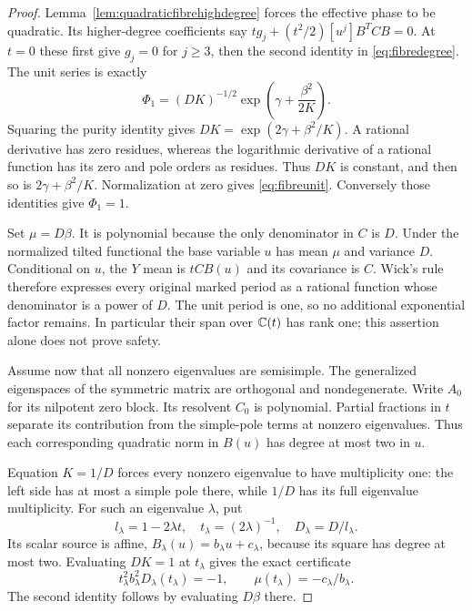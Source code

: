 \begin{proof}
Lemma~\ref{lem:quadraticfibrehighdegree} forces the effective
phase to be quadratic. Its higher-degree coefficients say
$tg_j+(t^2/2)[u^j]B^TCB=0$. At $t=0$ these first give $g_j=0$
for $j\ge3$, then the second identity in
\eqref{eq:fibredegree}. The unit series is exactly
\[
 \Phi_1=(DK)^{-1/2}\exp\!\left(\gamma+\frac{\beta^2}{2K}\right).
\]
Squaring the purity identity gives
$DK=\exp(2\gamma+\beta^2/K)$. A rational derivative has zero
residues, whereas the logarithmic derivative of a rational
function has its zero and pole orders as residues. Thus $DK$
is constant, and then so is $2\gamma+\beta^2/K$.
Normalization at zero gives
\eqref{eq:fibreunit}. Conversely those identities give
$\Phi_1=1$.

Set $\mu=D\beta$. It is polynomial because the only denominator
in $C$ is $D$. Under the normalized tilted functional the base
variable $u$ has mean $\mu$ and variance $D$. Conditional on
$u$, the $Y$ mean is $tCB(u)$ and its covariance is $C$.
Wick's rule therefore expresses every original marked period
as a rational function whose denominator is a power of $D$.
The unit period is one, so no additional exponential factor
remains. In particular their span over $\mathbb C(t)$ has rank one;
this assertion alone does not prove safety.

Assume now that all nonzero eigenvalues are semisimple. The
generalized eigenspaces of the symmetric matrix are orthogonal
and nondegenerate. Write $A_0$ for its nilpotent zero block.
Its resolvent $C_0$ is polynomial. Partial fractions in $t$
separate its contribution from the simple-pole terms at
nonzero eigenvalues. Thus each corresponding quadratic norm
in $B(u)$ has degree at most two in $u$.

Equation $K=1/D$ forces every nonzero eigenvalue to have
multiplicity one: the left side has at most a simple pole
there, while $1/D$ has its full eigenvalue multiplicity.
For such an eigenvalue $\lambda$, put
\[
 l_\lambda=1-2\lambda t,\quad t_\lambda=(2\lambda)^{-1},
 \quad D_\lambda=D/l_\lambda.
\]
Its scalar source is affine, $B_\lambda(u)=b_\lambda u+c_\lambda$,
because its square has degree at most two. Evaluating $DK=1$
at $t_\lambda$ gives the exact certificate
\begin{equation}\label{eq:fibrepolecertificate}
 t_\lambda^2b_\lambda^2D_\lambda(t_\lambda)=-1,
 \qquad
 \mu(t_\lambda)=-c_\lambda/b_\lambda.
\end{equation}
The second identity follows by evaluating $D\beta$ there.


\end{proof}
